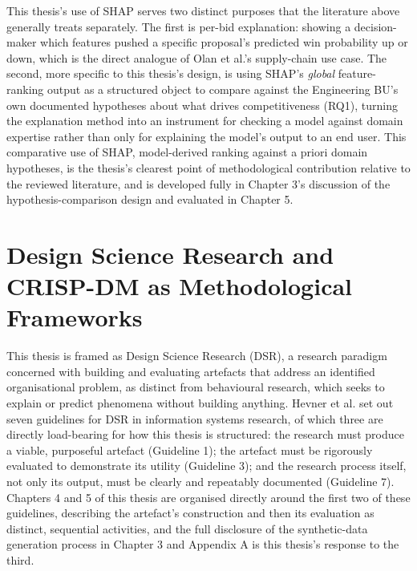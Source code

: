 \documentclass[12pt,oneside]{report}
\begin{document}
This thesis's use of SHAP serves two distinct purposes that the
literature above generally treats separately. The first is per-bid
explanation: showing a decision-maker which features pushed a specific
proposal's predicted win probability up or down, which is the direct
analogue of Olan et al.'s supply-chain use case. The second, more
specific to this thesis's design, is using SHAP's \emph{global}
feature-ranking output as a structured object to compare against the
Engineering BU's own documented hypotheses about what drives
competitiveness (RQ1), turning the explanation method into an instrument
for checking a model against domain expertise rather than only for
explaining the model's output to an end user. This comparative use of
SHAP, model-derived ranking against a priori domain hypotheses, is the
thesis's clearest point of methodological contribution relative to the
reviewed literature, and is developed fully in Chapter 3's discussion of
the hypothesis-comparison design and evaluated in Chapter 5.

\hypertarget{design-science-research-and-crisp-dm-as-methodological-frameworks}{%
\section{Design Science Research and CRISP-DM as Methodological
Frameworks}\label{design-science-research-and-crisp-dm-as-methodological-frameworks}}

This thesis is framed as Design Science Research (DSR), a research
paradigm concerned with building and evaluating artefacts that address
an identified organisational problem, as distinct from behavioural
research, which seeks to explain or predict phenomena without building
anything. Hevner et al. \citep{hevner2004design} set out seven
guidelines for DSR in information systems research, of which three are
directly load-bearing for how this thesis is structured: the research
must produce a viable, purposeful artefact (Guideline 1); the artefact
must be rigorously evaluated to demonstrate its utility (Guideline 3);
and the research process itself, not only its output, must be clearly
and repeatably documented (Guideline 7). Chapters 4 and 5 of this thesis
are organised directly around the first two of these guidelines,
describing the artefact's construction and then its evaluation as
distinct, sequential activities, and the full disclosure of the
synthetic-data generation process in Chapter 3 and Appendix A is this
thesis's response to the third.
\end{document}
